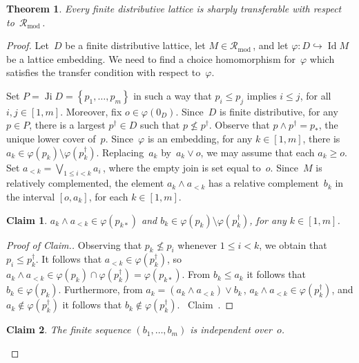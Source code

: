 \documentclass[reqno]{amsart}
\numberwithin{equation}{section}
\theoremstyle{plain}
\newtheorem{theorem}{Theorem}[section]
\newtheorem{claim}{Claim}
\theoremstyle{definition}
\theoremstyle{remark}
\newenvironment{cproof}
{\begin{proof}[Proof of Claim.]}
{{{}~{\rm Claim~{\theclaim}.}}\end{proof}}
\numberwithin{figure}{section}
\numberwithin{table}{section}
\begin{document}
\begin{theorem}\label{T:RCML}
Every finite distributive lattice is sharply transferable with respect to~${\mathcal{R}_{\mathrm{mod}}}$\,.
\end{theorem}

\begin{proof}
Let~$D$ be a finite distributive lattice, let $M\in{\mathcal{R}_{\mathrm{mod}}}$\,, and let ${\varphi}\colon D\hookrightarrow\operatorname{Id} M$ be a lattice embedding.
We need to find a choice homomorphism for~${\varphi}$ which satisfies the transfer condition with respect to~${\varphi}$.

Set $P=\operatorname{Ji} D={\left\{{p_1,\dots,p_m}\right\}}$ in such a way that $p_i\leq p_j$ implies $i\leq j$, for all $i,j\in[1,m]$.
Moreover, fix $o\in{\varphi}(0_D)$.
Since~$D$ is finite distributive, for any $p\in P$, there is a largest $p^{\dagger}\in D$ such that $p\nleq p^{\dagger}$.
Observe that $p\wedge p^{\dagger}=p_*$, the unique lower cover of~$p$.
Since~${\varphi}$ is an embedding, for any $k\in[1,m]$, there is $a_k\in{\varphi}(p_k)\setminus{\varphi}(p_k^{\dagger})$.
Replacing~$a_k$ by~$a_k\vee o$, we may assume that each $a_k\geq o$.
Set $a_{<k}=\bigvee_{1\leq i<k}a_i$\,, where the empty join is set equal to~$o$.
Since~$M$ is relatively complemented, the element $a_k\wedge a_{<k}$ has a relative complement~$b_k$ in the interval $[o,a_k]$, for each $k\in[1,m]$.

\setcounter{claim}{0}

\begin{claim}\label{Cl:Basicaka<k}
$a_k\wedge a_{<k}\in{\varphi}(p_{k*})$ and $b_k\in{\varphi}(p_k)\setminus{\varphi}(p_k^{\dagger})$, for any $k\in[1,m]$.
\end{claim}

\begin{cproof}
Observing that $p_k\nleq p_i$ whenever $1\leq i<k$, we obtain that $p_i\leq p^{\dagger}_k$.
It follows that $a_{<k}\in{\varphi}(p^{\dagger}_k)$, so $a_k\wedge a_{<k}\in{\varphi}(p_k)\cap{\varphi}(p^{\dagger}_k)={\varphi}(p_{k*})$.
{}From $b_k\leq a_k$ it follows that $b_k\in{\varphi}(p_k)$.
Furthermore, from $a_k=(a_k\wedge a_{<k})\vee b_k$\,, $a_k\wedge a_{<k}\in{\varphi}(p^{\dagger}_k)$, and $a_k\notin{\varphi}(p^{\dagger}_k)$ it follows that $b_k\notin{\varphi}(p^{\dagger}_k)$.
\end{cproof}

\begin{claim}\label{Cl:Indepbk}
The finite sequence $(b_1,\dots,b_m)$ is independent over~$o$.
\end{claim}


\end{proof}
\end{document}
